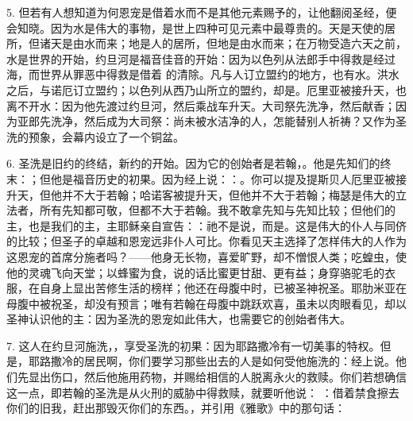 5. 但若有人想知道为何恩宠是借着水而不是其他元素赐予的，让他翻阅圣经，便会知晓。因为水是伟大的事物，是世上四种可见元素中最尊贵的。天是天使的居所，但诸天是由水而来；地是人的居所，但地是由水而来；在万物受造六天之前， 水是世界的开始，约旦河是福音佳音的开始：因为以色列从法郎手中得救是经过海，而世界从罪恶中得救是借着 的清除。凡与人订立盟约的地方，也有水。洪水之后，与诺厄订立盟约；以色列从西乃山所立的盟约，却是。厄里亚被接升天，也离不开水：因为他先渡过约旦河，然后乘战车升天。大司祭先洗净，然后献香；因为亚郎先洗净，然后成为大司祭：尚未被水洁净的人，怎能替别人祈祷？又作为圣洗的预象，会幕内设立了一个铜盆。\par

6. 圣洗是旧约的终结，新约的开始。因为它的创始者是若翰，。他是先知们的终末：；但他是福音历史的初果。因为经上说：：。你可以提及提斯贝人厄里亚被接升天，但他并不大于若翰；哈诺客被提升天，但他并不大于若翰；梅瑟是伟大的立法者，所有先知都可敬，但都不大于若翰。我不敢拿先知与先知比较；但他们的主，也是我们的主，主耶稣亲自宣告：：祂不是说，而是。这是伟大的仆人与同侪的比较；但圣子的卓越和恩宠远非仆人可比。你看见天主选择了怎样伟大的人作为这恩宠的首席分施者吗？——他身无长物，喜爱旷野，却不憎恨人类；吃蝗虫，使他的灵魂飞向天堂；以蜂蜜为食，说的话比蜜更甘甜、更有益；身穿骆驼毛的衣服，在自身上显出苦修生活的榜样；他还在母腹中时，已被圣神祝圣。耶肋米亚在母腹中被祝圣，却没有预言；唯有若翰在母腹中跳跃欢喜，虽未以肉眼看见，却以圣神认识他的主：因为圣洗的恩宠如此伟大，也需要它的创始者伟大。\par

7. 这人在约旦河施洗，，享受圣洗的初果：因为耶路撒冷有一切美事的特权。但是，耶路撒冷的居民啊，你们要学习那些出去的人是如何受他施洗的：经上说。他们先显出伤口，然后他施用药物，并赐给相信的人脱离永火的救赎。你们若想确信这一点，即若翰的圣洗是从火刑的威胁中得救赎，就要听他说：  ：借着禁食擦去你们的旧我，赶出那毁灭你们的东西。，并引用《雅歌》中的那句话：\par

